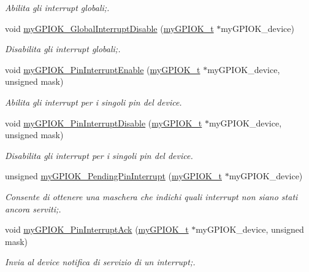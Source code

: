\begin{DoxyCompactItemize}
\begin{DoxyCompactList}\small\item\em Abilita gli interrupt globali;. \end{DoxyCompactList}\item 
void \hyperlink{group__my_g_p_i_o_k__t_gace0d81f5ec65978f22118a3f1fc8b222}{my\+G\+P\+I\+O\+K\+\_\+\+Global\+Interrupt\+Disable} (\hyperlink{structmy_g_p_i_o_k__t}{my\+G\+P\+I\+O\+K\+\_\+t} $\ast$my\+G\+P\+I\+O\+K\+\_\+device)
\begin{DoxyCompactList}\small\item\em Disabilita gli interrupt globali;. \end{DoxyCompactList}\item 
void \hyperlink{group__my_g_p_i_o_k__t_ga179c20f5f62e8ce1593cbedff2f00533}{my\+G\+P\+I\+O\+K\+\_\+\+Pin\+Interrupt\+Enable} (\hyperlink{structmy_g_p_i_o_k__t}{my\+G\+P\+I\+O\+K\+\_\+t} $\ast$my\+G\+P\+I\+O\+K\+\_\+device, unsigned mask)
\begin{DoxyCompactList}\small\item\em Abilita gli interrupt per i singoli pin del device. \end{DoxyCompactList}\item 
void \hyperlink{group__my_g_p_i_o_k__t_gabfd91641f98a4725aec779c8834ca92d}{my\+G\+P\+I\+O\+K\+\_\+\+Pin\+Interrupt\+Disable} (\hyperlink{structmy_g_p_i_o_k__t}{my\+G\+P\+I\+O\+K\+\_\+t} $\ast$my\+G\+P\+I\+O\+K\+\_\+device, unsigned mask)
\begin{DoxyCompactList}\small\item\em Disabilita gli interrupt per i singoli pin del device. \end{DoxyCompactList}\item 
unsigned \hyperlink{group__my_g_p_i_o_k__t_ga1b3ad44b9198f537493180d748de0b6c}{my\+G\+P\+I\+O\+K\+\_\+\+Pending\+Pin\+Interrupt} (\hyperlink{structmy_g_p_i_o_k__t}{my\+G\+P\+I\+O\+K\+\_\+t} $\ast$my\+G\+P\+I\+O\+K\+\_\+device)
\begin{DoxyCompactList}\small\item\em Consente di ottenere una maschera che indichi quali interrupt non siano stati ancora serviti;. \end{DoxyCompactList}\item 
void \hyperlink{group__my_g_p_i_o_k__t_ga8eaf8f1b21aa6f772c395faf457144f9}{my\+G\+P\+I\+O\+K\+\_\+\+Pin\+Interrupt\+Ack} (\hyperlink{structmy_g_p_i_o_k__t}{my\+G\+P\+I\+O\+K\+\_\+t} $\ast$my\+G\+P\+I\+O\+K\+\_\+device, unsigned mask)
\begin{DoxyCompactList}\small\item\em Invia al device notifica di servizio di un interrupt;. \end{DoxyCompactList}\end{DoxyCompactItemize}



